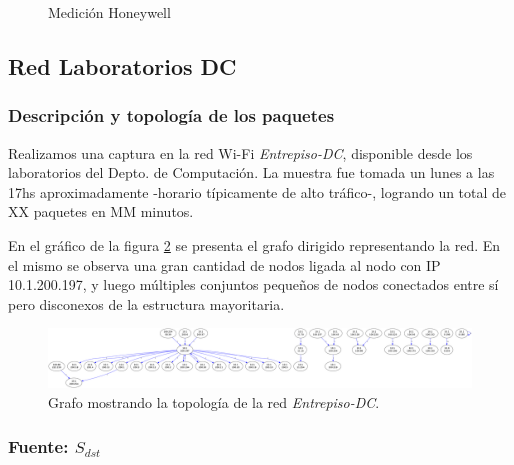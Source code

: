 \documentclass[10pt, a4paper]{article}
\begin{document}
\begin{figure}[H]
\begin{minipage}{0.5\linewidth}
     \caption{Medición Honeywell}\label{fig:Honeywell-src-	info}
   \end{minipage}
 \end{figure}

\subsection{Red Laboratorios DC}

\subsubsection{Descripción y topología de los paquetes}

Realizamos una captura en la red Wi-Fi \emph{Entrepiso-DC}, disponible desde los laboratorios del Depto. de Computación. La muestra fue tomada un lunes a las 17hs aproximadamente -horario típicamente de alto tráfico-, logrando un total de XX paquetes en MM minutos.

En el gráfico de la figura \ref{fig:entrepiso-dc-grafo} se presenta el grafo dirigido representando la red. En el mismo se observa una gran cantidad de nodos ligada al nodo con IP 10.1.200.197, y luego múltiples conjuntos pequeños de nodos conectados entre sí pero disconexos de la estructura mayoritaria.

\begin{figure}[H]
  \begin{center}
    \includegraphics[width=0.8\linewidth]{../imgs/entrepiso-dc-ips_red.png}
    \caption{Grafo mostrando la topología de la red \emph{Entrepiso-DC}.}
    \label{fig:entrepiso-dc-grafo}
  \end{center}
\end{figure}

\subsubsection{Fuente: $S_{dst}$}
\end{document}
